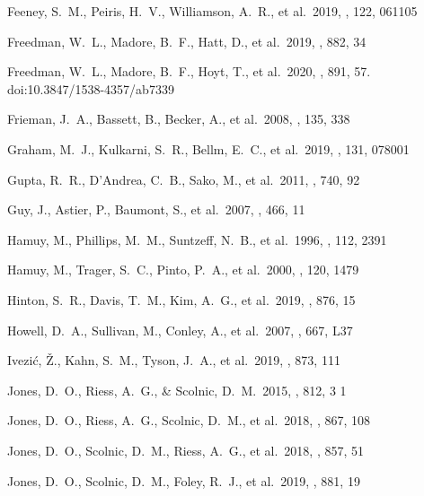 \documentclass[]{aa}
\begin{document}
\begin{thebibliography}{}

 Feeney, S.~M., Peiris, H.~V.,
Williamson, A.~R., et al.\ 2019, \prl, 122, 061105

 Freedman, W.~L., Madore, B.~F.,
Hatt, D., et al.\ 2019, \apj, 882, 34

 Freedman, W.~L., Madore, B.~F.,
Hoyt, T., et al.\ 2020, \apj, 891, 57. doi:10.3847/1538-4357/ab7339

 Frieman, J.~A., Bassett, B., Becker,
A., et al.\ 2008, \aj, 135, 338


 Graham, M.~J., Kulkarni, S.~R., Bellm,
E.~C., et al.\ 2019, \pasp, 131, 078001

 Gupta, R.~R., D'Andrea, C.~B., Sako, M.,
et al.\ 2011, \apj, 740, 92

 Guy, J., Astier, P., Baumont, S., et al.\
2007, \aap, 466, 11


 Hamuy, M., Phillips, M.~M., Suntzeff,
N.~B., et al.\ 1996, \aj, 112, 2391

 Hamuy, M., Trager, S.~C., Pinto, P.~A.,
et al.\ 2000, \aj, 120, 1479

 Hinton, S.~R., Davis, T.~M., Kim,
A.~G., et al.\ 2019, \apj, 876, 15

 Howell, D.~A., Sullivan, M., Conley,
A., et al.\ 2007, \apjl, 667, L37


 Ivezi{\'c}, {\v{Z}}., Kahn, S.~M.,
Tyson, J.~A., et al.\ 2019, \apj, 873, 111


 Jones, D.~O., Riess, A.~G., \& Scolnic,
D.~M.\ 2015, \apj, 812, 3 1

 Jones, D.~O., Riess, A.~G., Scolnic,
D.~M., et al.\ 2018, \apj, 867, 108

 Jones, D.~O., Scolnic, D.~M., Riess,
A.~G., et al.\ 2018, \apj, 857, 51

 Jones, D.~O., Scolnic, D.~M., Foley,
R.~J., et al.\ 2019, \apj, 881, 19


\end{thebibliography}
\end{document}

